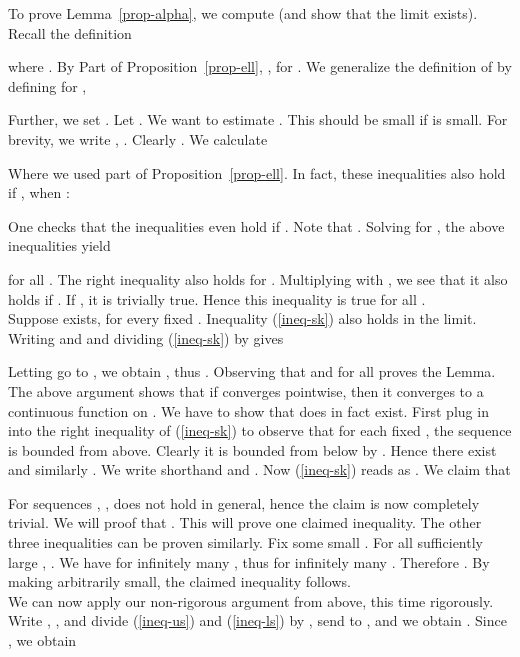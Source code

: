\documentclass[a4paper, 11pt]{article}
\begin{document}
To prove Lemma~\ref{prop-alpha}, we compute  (and show that the limit exists). Recall
the definition

where .  By Part  of
Proposition~\ref{prop-ell}, , for . We
generalize the definition of  by defining for ,

Further, we set .
 Let . We want to estimate
. This should be small if  is small.
For brevity, we write , . Clearly . We calculate

Where we used part  of Proposition~\ref{prop-ell}.  In fact, these
inequalities also hold if , when :

One checks that the inequalities even hold if . Note that .  Solving for
, the above inequalities yield

for all . The right inequality also holds for . Multiplying with , we see that it also holds if
. If , it is trivially true.
Hence this inequality is true for all .\\

Suppose  exists, for every fixed .
Inequality (\ref{ineq-sk}) also holds in the limit. Writing 
and  and dividing (\ref{ineq-sk}) by  gives

Letting  go to , we obtain , thus
. Observing that
 and  for all 
proves the Lemma. \\

The above argument shows that if  converges pointwise, then it
converges to a continuous function  on . We have to show
that  does in fact exist.  First
plug in  into the right inequality of (\ref{ineq-sk}) to
observe that for each fixed , the sequence  is bounded from above. Clearly it is bounded from below
by . Hence there exist  and similarly
. We write shorthand  and . Now (\ref{ineq-sk}) reads as 
. We claim that



For sequences , ,
 does not hold in
general, hence the claim is now completely trivial. We will proof that
.  This will
prove one claimed inequality. The other three inequalities can be
proven similarly.  Fix some small .  For all
sufficiently large , .  We have
 for infinitely many , thus
 for infinitely many .  Therefore .  By making 
arbitrarily small, the claimed inequality follows.\\

We can now apply our non-rigorous argument from above, this time
rigorously. Write , , and divide (\ref{ineq-us}) and
(\ref{ineq-ls}) by , send  to , and we obtain . Since , we obtain
\end{document}
